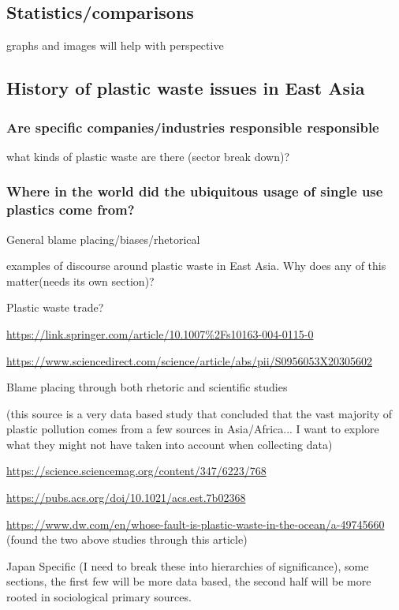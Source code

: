 \documentclass{book}\usepackage{knitr}
\begin{document}
\begin{knitrout}
\begin{kframe}
{\subsection{Statistics/comparisons}

graphs and images will help with perspective

\subsection{History of plastic waste issues in East Asia}

\subsubsection{Are specific companies/industries responsible responsible}

what kinds of plastic waste are there (sector break down)? 

\subsubsection{Where in the world did the ubiquitous usage of single use plastics come from?}

General blame placing/biases/rhetorical 

examples of discourse around plastic waste in East Asia. Why does any of this matter(needs its own section)?

Plastic waste trade? 

\url{https://link.springer.com/article/10.1007%2Fs10163-004-0115-0}

\url{https://www.sciencedirect.com/science/article/abs/pii/S0956053X20305602}

Blame placing through both rhetoric and scientific studies

(this source is a very data based study that concluded that the vast majority of plastic pollution comes from a few sources in Asia/Africa... I want to explore what they might not have taken into account when collecting data)

\url{https://science.sciencemag.org/content/347/6223/768}

\url{https://pubs.acs.org/doi/10.1021/acs.est.7b02368}

\url{https://www.dw.com/en/whose-fault-is-plastic-waste-in-the-ocean/a-49745660} (found the two above studies through this article)

Japan Specific (I need to break these into hierarchies of significance), some sections, the first  few will be more data based, the second half will be more rooted in sociological primary sources.

}
\end{kframe}
\end{knitrout}
\end{document}
